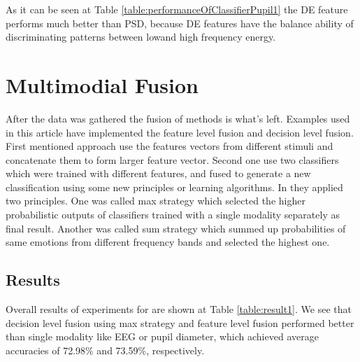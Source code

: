 \documentclass[10pt,journal,compsoc,twoside]{IEEEtran}
\newcommand{\Ref}[2]{#2 \ref{#1}}
\begin{document}
As it can be seen at \Ref{table:performanceOfClassifierPupil1}{Table} the DE feature performs much better than PSD, because DE features have the balance ability of discriminating patterns between  lowand high frequency energy.
 \section{Multimodial Fusion} 
After the data was gathered the fusion of methods is what's left. Examples used in this article have implemented the feature level fusion and decision level fusion. 
First mentioned approach use the features vectors from different stimuli and concatenate them to form larger feature vector. Second one use two classifiers which were trained with different features, and fused to generate a new classification using some new principles or learning algorithms. In \cite{WeiLongBoNanBaoLiang2014} they applied two principles. One was called max strategy which selected the higher probabilistic outputs of classifiers trained with a single modality separately as final result. Another was called sum strategy which summed up probabilities of same emotions from different frequency bands and selected the highest one.
\subsection{Results}
Overall results of experiments for \cite{WeiLongBoNanBaoLiang2014} are shown at \Ref{table:result1}{Table}.
We see that decision level fusion using max strategy and feature level fusion performed better than single modality like EEG or pupil diameter, which achieved average accuracies of 72.98\% and 73.59\%, respectively.
\end{document}
